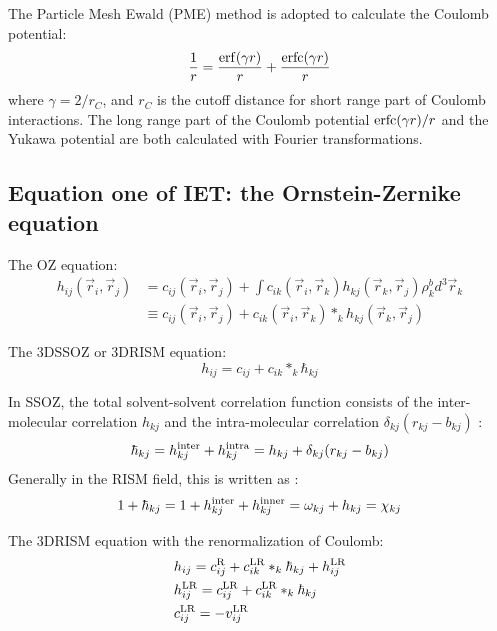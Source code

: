 \documentclass[aip,amsmath,amssymb,reprint,onecolumn]{revtex4-1}
\begin{document}
The Particle Mesh Ewald (PME) method is adopted to calculate the Coulomb potential:
\begin{equation*}\begin{split}
    \frac{1}{r} = \frac{{\rm erf}(\gamma r)}{r} + \frac{{\rm erfc}(\gamma r)}{r}
\end{split}\end{equation*}
where $\gamma=2/r_C$, and $r_C$ is the cutoff distance for short range part of Coulomb interactions. The long range part of the Coulomb potential ${\rm erfc}(\gamma r)/r$ and the Yukawa potential are both calculated with Fourier transformations.

\subsection{Equation one of IET: the Ornstein-Zernike equation}

The OZ equation:
\begin{equation}\begin{split}\label{eq:OZ}
    h_{ij}(\vec{r}_i,\vec{r}_j) &= c_{ij}(\vec{r}_i,\vec{r}_j) + \int c_{ik}(\vec{r}_i,\vec{r}_k)h_{kj}(\vec{r}_k,\vec{r}_j) \rho^b_kd^3\vec{r}_k \\
    &\equiv c_{ij}(\vec{r}_i,\vec{r}_j) + c_{ik}(\vec{r}_i,\vec{r}_k) *_k h_{kj}(\vec{r}_k,\vec{r}_j)
\end{split}\end{equation}

The 3DSSOZ or 3DRISM equation:
\begin{equation}\label{eq:SSOZ}
    h_{ij} = c_{ij} + c_{ik} *_k \hbar_{kj}
\end{equation}

In SSOZ, the total solvent-solvent correlation function consists of the inter-molecular correlation $h_{kj}$ and the intra-molecular correlation\cite{Cao_Huang_AdTS_2019} $\delta_{kj}(r_{kj}-b_{kj})$ :
\begin{equation}\label{eq:hbar}
    \hbar_{kj} = h^{\rm inter}_{kj} + h^{\rm intra}_{kj} = h_{kj} + \delta_{kj}(r_{kj}-b_{kj})
\end{equation}
Generally in the RISM field, this is written as \cite{Ratkova_Maxi_CR_2015}:
\begin{equation}\label{eq:omega-correlatin}
    1 + \hbar_{kj} = 1 + h^{\rm inter}_{kj} + h^{\rm inner}_{kj} = \omega_{kj} + h_{kj} = \chi_{kj}
\end{equation}

The 3DRISM equation with the renormalization of Coulomb:
\begin{equation}\begin{split}\label{eq:3DRISM}
    &h_{ij} = c_{ij}^{\rm R} + c_{ik}^{\rm LR} *_k \hbar_{kj} + h_{ij}^{\rm LR} \\
    &h_{ij}^{\rm LR} = c_{ij}^{\rm LR} + c_{ik}^{\rm LR} *_k \hbar_{kj} \\
    &c_{ij}^{\rm LR} = - v_{ij}^{\rm LR}
\end{split}\end{equation}
\end{document}

